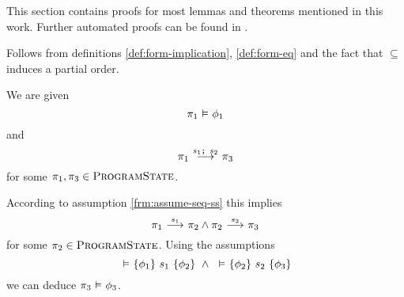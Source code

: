 This section contains proofs for most lemmas and theorems mentioned in this work.
Further automated proofs can be found in \cite{olydisGitHub}.

\begin{proofatend}
    Follows from definitions \ref{def:form-implication}, \ref{def:form-eq} and the fact that $\subseteq$ induces a partial order.
\end{proofatend}

\begin{proofatend}
    We are given 
    \begin{displaymath}
    \evalphiGen{\pi_1}{\phi_1}
    \end{displaymath}
    and
    \begin{displaymath}
    \sstepConsume{\sSeq{$s_1$}{$s_2$}}{\pi_1}{\pi_3}
    \end{displaymath}
    for some $\pi_1, \pi_3 \in \setProgramState$.
    
    According to assumption \ref{frm:assume-seq-ss} this implies
    \begin{displaymath}
    \sstepConsume{s_1}{\pi_1}{\pi_2} \wedge \sstepConsume{s_2}{\pi_2}{\pi_3}
    \end{displaymath}
    for some $\pi_2 \in \setProgramState$.
    Using the assumptions
    \begin{displaymath}
    \tHoare{}{\phi_1} {s_1} {\phi_2} ~\wedge~ \tHoare{}{\phi_2} {s_2} {\phi_3}
    \end{displaymath}
    we can deduce $\evalphiGen{\pi_3}{\phi_3}$.
\end{proofatend}

